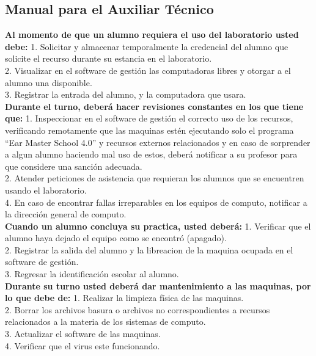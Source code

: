 \documentclass[spanish,12pt,letterpapper]{article}
\begin{document}
	\subsection{Manual para el Auxiliar Técnico}
	\textbf{Al momento de que un alumno requiera el uso del laboratorio usted debe:}
	1. Solicitar y almacenar temporalmente la credencial del alumno que solicite el recurso durante su estancia en el laboratorio.\\
	2. Visualizar en el software de gestión las computadoras libres y otorgar a el alumno una disponible.\\
	3. Registrar la entrada del alumno, y la computadora que usara.\\
	
	\textbf{Durante el turno, deberá hacer revisiones constantes en los que tiene que:}
	1. Inspeccionar en el software de gestión el correcto uso de los recursos, verificando remotamente que las maquinas estén ejecutando solo el programa ``Ear Master School 4.0'' y recursos externos relacionados y en caso de sorprender a algun alumno haciendo mal uso de estos, deberá notificar a su profesor para que considere una sanción adecuada.\\
	2. Atender peticiones de asistencia que requieran los alumnos que se encuentren usando el laboratorio.\\
	4. En caso de encontrar fallas irreparables en los equipos de computo, notificar a la dirección general de computo.\\	
	
	\textbf{Cuando un alumno concluya su practica, usted deberá:}
	1. Verificar que el alumno haya dejado el equipo como se encontró (apagado).\\
	2. Registrar la salida del alumno y la libreacion de la maquina ocupada en el software de gestión.\\
	3. Regresar la identificación escolar al alumno.\\
	
	\textbf{Durante su turno usted deberá dar mantenimiento a las maquinas, por lo que debe de:}
	1. Realizar la limpieza física de las maquinas.\\
	2. Borrar los archivos basura o archivos no correspondientes a recursos relacionados a la materia de los sistemas de computo.\\
	3. Actualizar el software de las maquinas.\\
	4. Verificar que el virus este funcionando.\\
	
\end{document}
